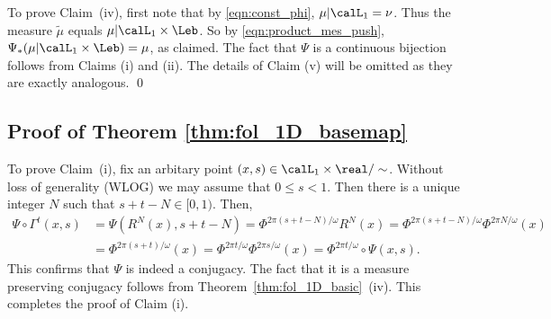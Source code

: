 \documentclass[12pt,oneside]{article}
\newcommand{\Return}{R}
\newcommand{\Iso}{\Psi}
\newcommand{\Susp}{\Gamma}
\begin{document}
To prove Claim~(iv), first note that by \eqref{eqn:const_phi}, $\mu|\calL_1 = \nu$. Thus the measure $\tilde{\mu}$ equals $\mu|\calL_1 \times \Leb$. So by \eqref{eqn:product_mes_push}, $\Iso_{*} (\mu|\calL_1 \times \Leb) = \mu$, as claimed. The fact that $\Iso$ is a continuous bijection follows from Claims (i) and (ii). The details of Claim (v) will be omitted as they are exactly analogous. \qed

\subsection{Proof of Theorem \ref{thm:fol_1D_basemap}} \label{sec:proof:fol_1D_basemap}

To prove Claim~(i), fix an arbitary point $(x,s)\in \calL_1 \times \real/\sim$. Without loss of generality (WLOG) we may assume that $0\leq s<1$. Then there is a unique integer $N$ such that $s+t-N\in [0,1)$. Then,
%
\[\begin{split} 
\Iso\circ \Susp^t (x,s) &= \Iso(\Return^N(x), s+t-N) = \Phi^{2\pi(s+t-N)/\omega} \Return^N(x) = \Phi^{2\pi(s+t-N)/\omega} \Phi^{2\pi N/\omega}(x)  \\
& = \Phi^{2\pi(s+t)/\omega} (x)=  \Phi^{2\pi t/\omega} \Phi^{2\pi s/\omega} (x) = \Phi^{2\pi t/\omega} \circ \Iso (x,s).
\end{split}\]
%
This confirms that $\Iso$ is indeed a conjugacy. The fact that it is a measure preserving conjugacy follows from Theorem~\ref{thm:fol_1D_basic}~(iv). This completes the proof of Claim (i).
\end{document}
